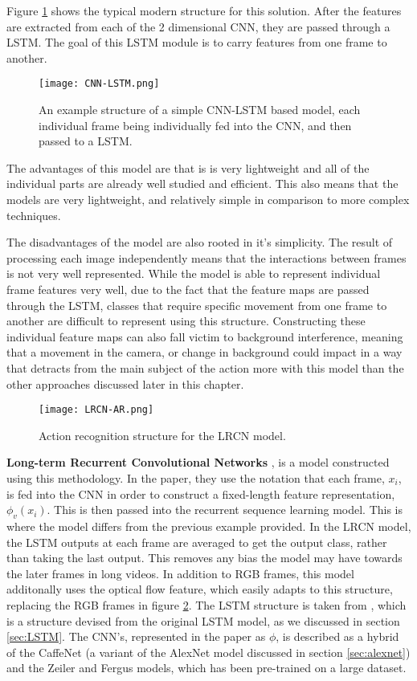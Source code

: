 Figure \ref{fig:cnn-lstm} shows the typical modern structure for this solution. After the features are extracted from each of the 2 dimensional CNN, they are passed through a LSTM. The goal of this LSTM module is to carry features from one frame to another.

\begin{figure}[t]
	\texttt{[image: CNN-LSTM.png]}
	\centering
	\caption{An example structure of a simple CNN-LSTM based model, each individual frame being individually fed into the CNN, and then passed to a LSTM.}
	\label{fig:cnn-lstm}
\end{figure}

The advantages of this model are that is is very lightweight and all of the individual parts are already well studied and efficient. This also means that the models are very lightweight, and relatively simple in comparison to more complex techniques.

The disadvantages of the model are also rooted in it's simplicity. The result of processing each image independently means that the interactions between frames is not very well represented. While the model is able to represent individual frame features very well, due to the fact that the feature maps are passed through the LSTM, classes that require specific movement from one frame to another are difficult to represent using this structure. Constructing these individual feature maps can also fall victim to background interference, meaning that a movement in the camera, or change in background could impact in a way that detracts from the main subject of the action more with this model than the other approaches discussed later in this chapter.

\begin{figure}[t]
	\texttt{[image: LRCN-AR.png]}
	\centering
	\caption{Action recognition structure for the LRCN model. \cite{LRCNS}}
	\label{fig:lrcn-ar}
\end{figure}

\textbf{Long-term Recurrent Convolutional Networks} \cite{LRCNS}, is a model constructed using this methodology. In the paper, they use the notation that each frame, $x_{i}$, is fed into the CNN in order to construct a fixed-length feature representation, $\phi_{v}(x_{i})$. This is then passed into the recurrent sequence learning model. This is where the model differs from the previous example provided. In the LRCN model, the LSTM outputs at each frame are averaged to get the output class, rather than taking the last output. This removes any bias the model may have towards the later frames in long videos. In addition to RGB frames, this model additonally uses the optical flow feature, which easily adapts to this structure, replacing the RGB frames in figure \ref{fig:lrcn-ar}. The LSTM structure is taken from \cite{LSTM-2015}, which is a structure devised from the original LSTM model, as we discussed in section \ref{sec:LSTM}. The CNN's, represented in the paper as $\phi$, is described as a hybrid of the CaffeNet \cite{caffenet} (a variant of the AlexNet \cite{alexnet} model discussed in section \ref{sec:alexnet}) and the Zeiler and Fergus \cite{zeilerfergus} models, which has been pre-trained on a large dataset.

